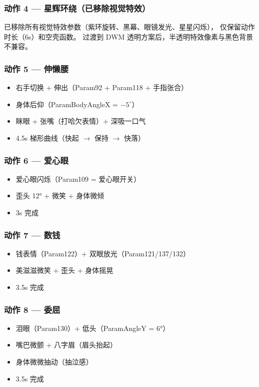 \documentclass[12pt,a4paper]{ctexart}
\begin{document}
\subsubsection{动作 4 --- 星辉环绕（已移除视觉特效）}
已移除所有视觉特效参数（紫环旋转、黑幕、眼镜发光、星星闪烁），
仅保留动作时长（6s）和空壳函数。
过渡到 DWM 透明方案后，半透明特效像素与黑色背景不兼容。

\subsubsection{动作 5 --- 伸懒腰}
\begin{itemize}
    \item 右手切换 + 伸出（Param92 + Param118 + 手指张合）
    \item 身体后仰（ParamBodyAngleX = $-5^\circ$）
    \item 眯眼 + 张嘴（打哈欠表情）+ 深吸一口气
    \item 4.5s 梯形曲线（快起 $\to$ 保持 $\to$ 快落）
\end{itemize}

\subsubsection{动作 6 --- 爱心眼}
\begin{itemize}
    \item 爱心眼闪烁（Param109 = 爱心眼开关）
    \item 歪头 12° + 微笑 + 身体微倾
    \item 3s 完成
\end{itemize}

\subsubsection{动作 7 --- 数钱}
\begin{itemize}
    \item 钱表情（Param122）+ 双眼放光（Param121/137/132）
    \item 美滋滋微笑 + 歪头 + 身体摇晃
    \item 3.5s 完成
\end{itemize}

\subsubsection{动作 8 --- 委屈}
\begin{itemize}
    \item 泪眼（Param130）+ 低头（ParamAngleY = 6°）
    \item 嘴巴微颤 + 八字眉（眉头抬起）
    \item 身体微微抽动（抽泣感）
    \item 3.5s 完成
\end{itemize}
\end{document}
